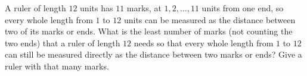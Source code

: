 A ruler of length $12$ units has $11$ marks, at $1,2,\dots,11$ units from one end, so every whole length from $1$ to $12$ units can be measured as the distance between two of its marks or ends. What is the least number of marks (not counting the two ends) that a ruler of length $12$ needs so that every whole length from $1$ to $12$ can still be measured directly as the distance between two marks or ends? Give a ruler with that many marks.
